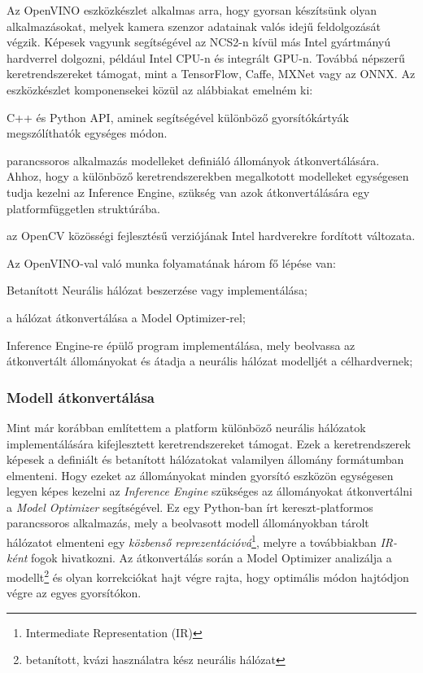 Az OpenVINO eszközkészlet alkalmas arra, hogy gyorsan készítsünk olyan alkalmazásokat, melyek %
kamera szenzor adatainak valós idejű feldolgozását végzik. Képesek vagyunk segítségével az NCS2-n kívül más Intel gyártmányú hardverrel dolgozni, például Intel CPU-n és integrált GPU-n. Továbbá népszerű keretrendszereket támogat, mint a TensorFlow, Caffe, MXNet vagy az ONNX. Az eszközkészlet komponensekei közül az alábbiakat emelném ki:
\begin{description}[noitemsep]
	\item[Inference Engine] C++ és Python API, aminek segítségével különböző gyorsítókártyák megszólíthatók egységes módon.
	\item[Model Optimizer] parancssoros alkalmazás modelleket definiáló állományok átkonvertálására. Ahhoz, hogy a különböző keretrendszerekben megalkotott modelleket egységesen tudja kezelni az Inference Engine, szükség van azok átkonvertálására egy platformfüggetlen struktúrába.
	\item[OpenCV] az OpenCV közösségi fejlesztésű verziójának Intel hardverekre fordított változata.
\end{description}

Az OpenVINO-val való munka folyamatának három fő lépése van:
\begin{enumerate*}[label={}, font=\bfseries]
	\item Betanított Neurális hálózat beszerzése vagy implementálása;
	\item a hálózat átkonvertálása a Model Optimizer-rel;
	\item Inference Engine-re épülő program implementálása, mely beolvassa az átkonvertált állományokat és átadja a neurális hálózat modelljét a célhardvernek;
\end{enumerate*}

\subsubsection{Modell átkonvertálása}
Mint már korábban említettem a platform különböző neurális hálózatok implementálására kifejlesztett keretrendszereket támogat. Ezek a keretrendszerek képesek a definiált és betanított hálózatokat valamilyen állomány formátumban elmenteni. Hogy ezeket az állományokat minden gyorsító eszközön egységesen legyen képes kezelni az \emph{Inference Engine} szükséges az állományokat átkonvertálni a \emph{Model Optimizer} segítségével. Ez egy Python-ban írt kereszt-platformos parancssoros alkalmazás, mely a beolvasott modell állományokban tárolt hálózatot elmenteni egy \emph{közbenső reprezentációvá}\footnote{Intermediate Representation (IR)}, melyre a továbbiakban \emph{IR-ként} fogok hivatkozni. Az átkonvertálás során a Model Optimizer analizálja a modellt\footnote{betanított, kvázi használatra kész neurális hálózat} és olyan korrekciókat hajt végre rajta, hogy optimális módon hajtódjon végre az egyes gyorsítókon. 

